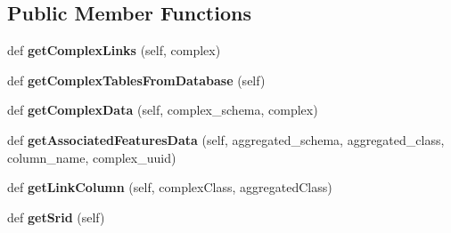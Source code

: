 \subsection*{Public Member Functions}
\begin{DoxyCompactItemize}
\item 
\mbox{\label{class_dsg_tools_1_1_factories_1_1_sql_factory_1_1sql_generator_1_1_sql_generator_a2397bc8e4660df6ab7d9bd157e0372e3}} 
def {\bfseries get\+Complex\+Links} (self, complex)
\item 
\mbox{\label{class_dsg_tools_1_1_factories_1_1_sql_factory_1_1sql_generator_1_1_sql_generator_a91125d510879809e584835c18df069da}} 
def {\bfseries get\+Complex\+Tables\+From\+Database} (self)
\item 
\mbox{\label{class_dsg_tools_1_1_factories_1_1_sql_factory_1_1sql_generator_1_1_sql_generator_a2c45bcf299619e907578f0f4174faf98}} 
def {\bfseries get\+Complex\+Data} (self, complex\+\_\+schema, complex)
\item 
\mbox{\label{class_dsg_tools_1_1_factories_1_1_sql_factory_1_1sql_generator_1_1_sql_generator_a770329fc203c1a270a037b316d1b5ea9}} 
def {\bfseries get\+Associated\+Features\+Data} (self, aggregated\+\_\+schema, aggregated\+\_\+class, column\+\_\+name, complex\+\_\+uuid)
\item 
\mbox{\label{class_dsg_tools_1_1_factories_1_1_sql_factory_1_1sql_generator_1_1_sql_generator_ad5298d35d8ac71b0a355f6de0d04ec07}} 
def {\bfseries get\+Link\+Column} (self, complex\+Class, aggregated\+Class)
\item 
\mbox{\label{class_dsg_tools_1_1_factories_1_1_sql_factory_1_1sql_generator_1_1_sql_generator_a5409646e0822486c22605275cff862bc}} 
def {\bfseries get\+Srid} (self)
\item 
\mbox{\label{class_dsg_tools_1_1_factories_1_1_sql_factory_1_1sql_generator_1_1_sql_generator_a004d101e93fdf604d58cf5fb1af659b5}} 

\end{DoxyCompactItemize}
